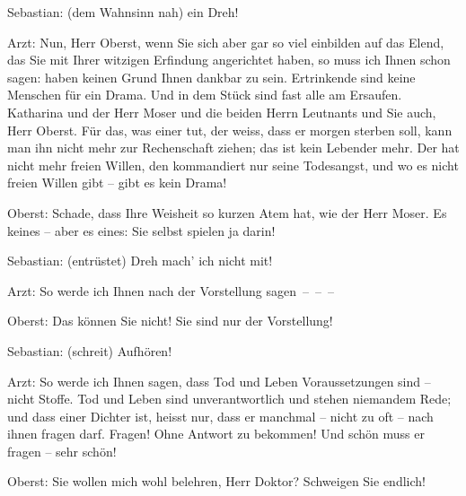 \pstart
           Sebastian: (dem Wahnsinn nah)  ein Dreh!\pend
           
\pstart
           Arzt: Nun, Herr Oberst, wenn Sie sich aber gar so viel einbilden auf das Elend, das
               Sie mit Ihrer witzigen Erfindung angerichtet haben, so muss ich Ihnen schon sagen:
                   haben keinen Grund Ihnen dankbar zu sein.
               Ertrinkende sind keine Menschen für ein Drama. Und in dem Stück sind fast alle am
               Ersaufen. Katharina und der Herr Moser und die beiden Herrn Leutnants und Sie auch,
               Herr Oberst. Für das, was einer tut, der weiss, dass er morgen {\pb}sterben soll, kann man ihn nicht
               mehr zur Rechenschaft ziehen; das ist kein Lebender mehr. Der hat nicht mehr freien
               Willen, den kommandiert nur seine Todesangst, und wo es nicht freien Willen gibt –
               gibt es kein Drama!\pend
           
\pstart
           Oberst: Schade, dass Ihre Weisheit so kurzen Atem hat, wie der Herr Moser. Es \label{T_L01900-3v}\label{T_L01900-3h} keines – aber es \label{T_L01900-4v}\label{T_L01900-4h} eines: Sie selbst spielen ja darin!\pend
           
\pstart
           Sebastian: (entrüstet)  Dreh mach’ ich nicht mit!\pend
           
\pstart
           Arzt: So werde ich Ihnen nach der Vorstellung sagen – – –\pend
           
\pstart
           Oberst: Das können Sie nicht! Sie sind nur  der
               Vorstellung!\pend
           
\pstart
           Sebastian: (schreit) Aufhören!\pend
           
\pstart
           Arzt: So werde ich Ihnen sagen, dass Tod und Leben Voraussetzungen sind – nicht
               Stoffe. Tod und Leben sind unverantwortlich und stehen niemandem Rede; und dass einer
               Dichter ist, heisst nur, dass er manchmal – nicht zu oft – nach ihnen fragen darf.
               Fragen! Ohne Antwort zu bekommen! Und schön muss er fragen – sehr schön!\pend
           
\pstart
           Oberst: Sie wollen mich wohl belehren, Herr Doktor? Schweigen Sie endlich!\pend
           
